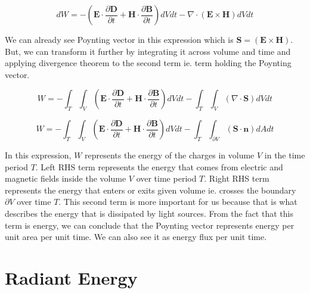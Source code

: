 \documentclass{article}
\begin{document}
\[ dW = -(\mathbf{E} \cdot \frac{\partial \mathbf{D}}{\partial t} + \mathbf{H} \cdot \frac{\partial \mathbf{B}}{\partial t})dVdt - \nabla \cdot (\mathbf{E} \times \mathbf{H})dVdt \]

We can already see Poynting vector in this expression which is $\mathbf{S} = (\mathbf{E} \times \mathbf{H})$. But, we can transform it further by integrating it across volume and time and applying divergence theorem to the second term ie. term holding the Poynting vector.

\[ W = -\int_{T}\int_{V}(\mathbf{E} \cdot \frac{\partial \mathbf{D}}{\partial t} + \mathbf{H} \cdot \frac{\partial \mathbf{B}}{\partial t})dVdt - \int_{T}\int_{V}(\nabla \cdot \mathbf{S}) dVdt \]

\[ W = -\int_{T}\int_{V}(\mathbf{E} \cdot \frac{\partial \mathbf{D}}{\partial t} + \mathbf{H} \cdot \frac{\partial \mathbf{B}}{\partial t})dVdt - \int_{T}\int_{\partial V}(\mathbf{S} \cdot \mathbf{n} )dAdt \]

In this expression, $W$ represents the energy of the charges in volume $V$ in the time period $T$. Left RHS term represents the energy that comes from electric and magnetic fields inside the volume $V$ over time period $T$. Right RHS term represents the energy that enters or exits given volume ie. crosses the boundary $\partial V$ over time $T$. This second term is more important for us because that is what describes the energy that is dissipated by light sources. From the fact that this term is energy, we can conclude that the Poynting vector represents energy per unit area per unit time. We can also see it as energy flux per unit time.

\section{Radiant Energy}
\end{document}
